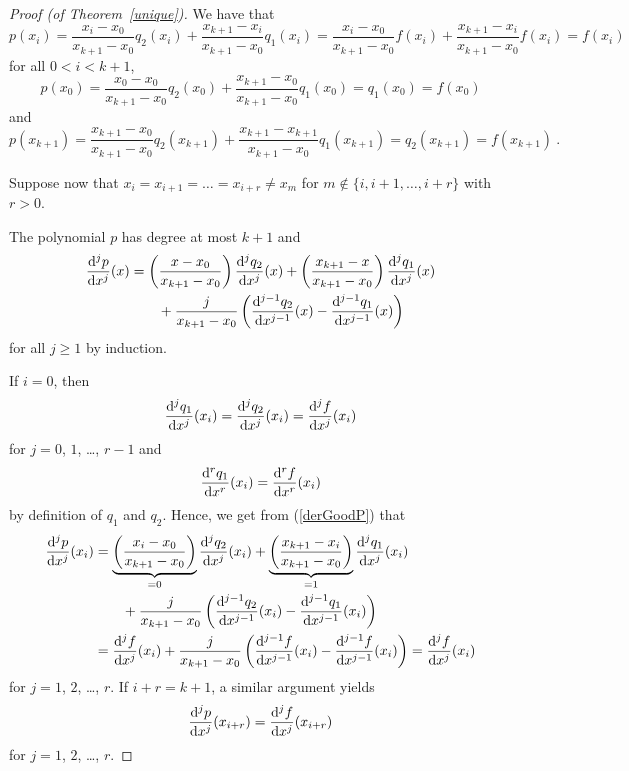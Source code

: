 \begin{proof}[Proof (of Theorem~\ref{unique})]
We have that
\[
p(x_i) = \frac{x_i-x_0}{x_{k+1}- x_0} q_2(x_i) +
\frac{x_{k+1}-x_i}{x_{k+1}- x_0} q_1(x_i)
= \frac{x_i-x_0}{x_{k+1}- x_0} f(x_i) +
\frac{x_{k+1}-x_i}{x_{k+1}- x_0} f(x_i) = f(x_i)
\]
for all $0<i<k+1$,
\[
p(x_0) = \frac{x_0-x_0}{x_{k+1}- x_0} q_2(x_0) +
\frac{x_{k+1}-x_0}{x_{k+1}- x_0} q_1(x_0)
= q_1(x_0) = f(x_0)
\]
and
\[
p(x_{k+1}) = \frac{x_{k+1}-x_0}{x_{k+1}- x_0} q_2(x_{k+1}) +
\frac{x_{k+1}-x_{k+1}}{x_{k+1}- x_0} q_1(x_{k+1})
= q_2(x_{k+1}) = f(x_{k+1}) \ .
\]

Suppose now that $x_i = x_{i+1} = \ldots = x_{i+r} \neq x_m$ for
$m \not\in \{i,i+1, \ldots, i+r\}$ with $r>0$.

The polynomial $p$ has degree at most $k+1$ and
\begin{equation}\label{derGoodP}
\begin{split}
\frac{\mathrm{d}^{j}{p}}{\mathrm{d}{x}^{j}}(x)
&= \left(\frac{x-x_0}{x_{k+1}-x_0}\right)\frac{\mathrm{d}^{j}{q_2}}{\mathrm{d}{x}^{j}}(x) +
\left(\frac{x_{k+1}-x}{x_{k+1}-x_0}\right) \frac{\mathrm{d}^{j}{q_1}}{\mathrm{d}{x}^{j}}(x) \\
& \qquad + \frac{j}{x_{k+1}-x_0}\left(
\frac{\mathrm{d}^{j-1}{q_2}}{\mathrm{d}{x}^{j-1}}(x)-\frac{\mathrm{d}^{j-1}{q_1}}{\mathrm{d}{x}^{j-1}}(x)\right)
\end{split}
\end{equation}
for all $j\geq 1$ by induction.

If $i=0$, then
\[
\frac{\mathrm{d}^{j}{q_1}}{\mathrm{d}{x}^{j}}(x_i) = \frac{\mathrm{d}^{j}{q_2}}{\mathrm{d}{x}^{j}}(x_i) = \frac{\mathrm{d}^{j}{f}}{\mathrm{d}{x}^{j}}(x_i)
\]
for $j=0$, $1$, \ldots, $r-1$ and
\[
\frac{\mathrm{d}^{r}{q_1}}{\mathrm{d}{x}^{r}}(x_i) = \frac{\mathrm{d}^{r}{f}}{\mathrm{d}{x}^{r}}(x_i)
\]
by definition of $q_1$ and $q_2$.  Hence, we get from (\ref{derGoodP})
that
\begin{align*}
\frac{\mathrm{d}^{j}{p}}{\mathrm{d}{x}^{j}}(x_i)
& = \underbrace{\left(\frac{x_i-x_0}{x_{k+1}-x_0}\right)}_{=0}
\frac{\mathrm{d}^{j}{q_2}}{\mathrm{d}{x}^{j}}(x_i) +
\underbrace{\left(\frac{x_{k+1}-x_i}{x_{k+1}-x_0}\right)}_{=1}
\frac{\mathrm{d}^{j}{q_1}}{\mathrm{d}{x}^{j}}(x_i) \\
&\qquad  + \frac{j}{x_{k+1}-x_0}\left(
\frac{\mathrm{d}^{j-1}{q_2}}{\mathrm{d}{x}^{j-1}}(x_i)-\frac{\mathrm{d}^{j-1}{q_1}}{\mathrm{d}{x}^{j-1}}(x_i)\right) \\
&= \frac{\mathrm{d}^{j}{f}}{\mathrm{d}{x}^{j}}(x_i) + \frac{j}{x_{k+1}-x_0}\left(
\frac{\mathrm{d}^{j-1}{f}}{\mathrm{d}{x}^{j-1}}(x_i)-\frac{\mathrm{d}^{j-1}{f}}{\mathrm{d}{x}^{j-1}}(x_i)\right)
= \frac{\mathrm{d}^{j}{f}}{\mathrm{d}{x}^{j}}(x_i)
\end{align*}
for $j=1$, $2$, \ldots, $r$.  If $i+r=k+1$, a similar argument yields
\[
  \frac{\mathrm{d}^{j}{p}}{\mathrm{d}{x}^{j}}(x_{i+r}) = \frac{\mathrm{d}^{j}{f}}{\mathrm{d}{x}^{j}}(x_{i+r})
\]
for $j=1$, $2$, \ldots, $r$.


\end{proof}
